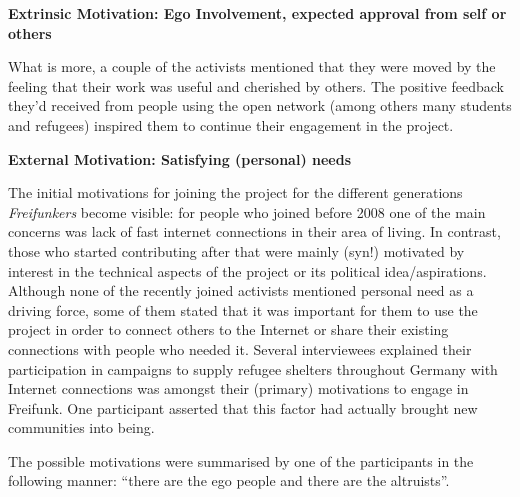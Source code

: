 \textbf{Extrinsic Motivation: Ego Involvement, expected approval from self or others}

What is more, a couple of the activists mentioned that they were moved by the feeling that their work was useful and cherished by others.
The positive feedback they'd received from people using the open network (among others many students and refugees) inspired them to continue their engagement in the project.


\textbf{External Motivation: Satisfying (personal) needs}

The initial motivations for joining the project for the different generations \textit{Freifunkers} become visible:
for people who joined before 2008 one of the main concerns was lack of fast internet connections in their area of living.
In contrast, those who started contributing after that were mainly (syn!) motivated by interest in the technical aspects of the project or its political idea/aspirations.
Although none of the recently joined activists mentioned personal need as a driving force,
some of them stated that it was important for them to use the project in order to connect others to the Internet or share their existing connections with people who needed it.
Several interviewees explained their participation in campaigns to supply refugee shelters throughout Germany with Internet connections was amongst their (primary) motivations to engage in Freifunk.
One participant asserted that this factor had actually brought new communities into being.


The possible motivations were summarised by one of the participants in the following manner: ``there are the ego people and there are the altruists''.


